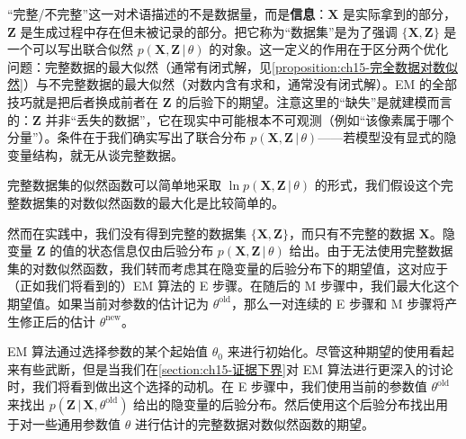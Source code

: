 \documentclass[../../main.tex]{subfiles}
\begin{document}
\begin{remark}
“完整/不完整”这一对术语描述的不是数据量，而是\textbf{信息}：$\bm{X}$ 是实际拿到的部分，$\bm{Z}$ 是生成过程中存在但未被记录的部分。把它称为“数据集”是为了强调 $\{\bm{X},\bm{Z}\}$ 是一个可以写出联合似然 $p(\bm{X},\bm{Z}\,|\,\theta)$ 的对象。这一定义的作用在于区分两个优化问题：完整数据的最大似然（通常有闭式解，见\cref{proposition:ch15-完全数据对数似然}）与不完整数据的最大似然（对数内含有求和，通常没有闭式解）。EM 的全部技巧就是把后者换成前者在 $\bm{Z}$ 的后验下的期望。注意这里的“缺失”是就建模而言的：$\bm{Z}$ 并非“丢失的数据”，它在现实中可能根本不可观测（例如“该像素属于哪个分量”）。条件在于我们确实写出了联合分布 $p(\bm{X},\bm{Z}\,|\,\theta)$——若模型没有显式的隐变量结构，就无从谈完整数据。
\end{remark}

完整数据集的似然函数可以简单地采取 $\ln p(\bm{X},\bm{Z}\,|\,\theta)$ 的形式，我们假设这个完整数据集的对数似然函数的最大化是比较简单的。

然而在实践中，我们没有得到完整的数据集 $\{\bm{X},\bm{Z}\}$，而只有不完整的数据 $\bm{X}$。隐变量 $\bm{Z}$ 的值的状态信息仅由后验分布 $p(\bm{X},\bm{Z}\,|\,\theta)$ 给出。由于无法使用完整数据集的对数似然函数，我们转而考虑其在隐变量的后验分布下的期望值，这对应于（正如我们将看到的）EM 算法的 E 步骤。在随后的 M 步骤中，我们最大化这个期望值。如果当前对参数的估计记为 $\theta^{\text{old}}$，那么一对连续的 E 步骤和 M 步骤将产生修正后的估计 $\theta^{\text{new}}$。

EM 算法通过选择参数的某个起始值 $\theta_0$ 来进行初始化。尽管这种期望的使用看起来有些武断，但是当我们在\cref{section:ch15-证据下界}对 EM 算法进行更深入的讨论时，我们将看到做出这个选择的动机。在 E 步骤中，我们使用当前的参数值 $\theta^{\text{old}}$ 来找出 $p(\bm{Z}\,|\,\bm{X},\theta^{\text{old}})$ 给出的隐变量的后验分布。然后使用这个后验分布找出用于对一些通用参数值 $\theta$ 进行估计的完整数据对数似然函数的期望。
\end{document}
